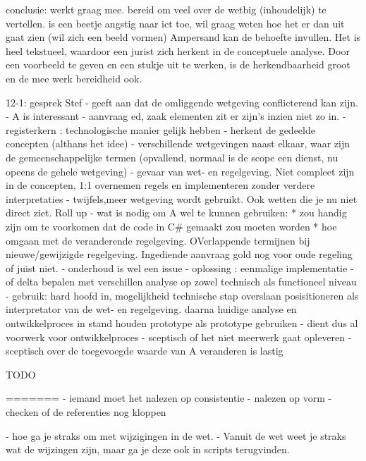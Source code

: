 conclusie: 
werkt graag mee. bereid om veel over de wetbig (inhoudelijk) te vertellen.
is een beetje angstig naar ict toe, wil graag weten hoe het er dan uit gaat zien (wil zich een beeld vormen)
Ampersand kan de behoefte invullen. Het is heel tekstueel, waardoor een jurist zich herkent in de conceptuele analyse.
Door een voorbeeld te geven en een stukje uit te werken, is de herkendbaarheid groot en de mee werk bereidheid ook.

12-1: gesprek Stef
- geeft aan dat de omliggende wetgeving conflicterend kan zijn.
- A is interessant
- aanvraag ed, zaak elementen zit er zijn's inzien niet zo in.
- registerkern : technologische manier gelijk hebben
- herkent de gedeelde concepten (althans het idee)
- verschillende wetgevingen naast elkaar, waar zijn de gemeenschappelijke termen (opvallend, normaal is de scope een dienst, nu opeens de gehele wetgeving)
- gevaar van wet- en regelgeving. Niet compleet zijn in de concepten, 1:1 overnemen regels en implementeren zonder verdere interpretaties
- twijfels,meer wetgeving wordt gebruikt. Ook wetten die je nu niet direct ziet. Roll up
- wat is nodig om A wel te kunnen  gebruiken:
* zou handig zijn om te voorkomen dat de code in C\# gemaakt zou moeten worden
* hoe omgaan met de veranderende regelgeving. OVerlappende termijnen bij nieuwe/gewijzigde regelgeving. Ingediende aanvraag gold nog voor oude regeling of juist niet.
- onderhoud is wel een issue
- oplossing : eenmalige implementatie
- of delta bepalen met verschillen analyse op zowel technisch als functioneel niveau
- gebruik: hard hoofd in, 
mogelijkheid technische stap overslaan
posisitioneren als interpretator van de wet- en regelgeving.
daarna huidige analyse en ontwikkelproces in stand houden
prototype als prototype gebruiken
- dient dus al voorwerk voor ontwikkelproces 
- sceptisch of het niet meerwerk gaat opleveren
- sceptisch over de toegevoegde waarde van A
veranderen is lastig

TODO


=======
- iemand moet het nalezen op consistentie
- nalezen op vorm
- checken of de referenties nog kloppen


- hoe ga je straks om met wijzigingen in de wet. 
- Vanuit de wet weet je straks wat de wijzingen zijn, maar ga je deze ook in scripts terugvinden.
